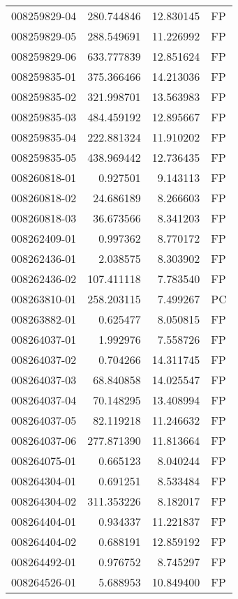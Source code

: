 \begin{tabular}{lrrl}
008259829-04 &  280.744846 &    12.830145 &   FP \\
008259829-05 &  288.549691 &    11.226992 &   FP \\
008259829-06 &  633.777839 &    12.851624 &   FP \\
008259835-01 &  375.366466 &    14.213036 &   FP \\
008259835-02 &  321.998701 &    13.563983 &   FP \\
008259835-03 &  484.459192 &    12.895667 &   FP \\
008259835-04 &  222.881324 &    11.910202 &   FP \\
008259835-05 &  438.969442 &    12.736435 &   FP \\
008260818-01 &    0.927501 &     9.143113 &   FP \\
008260818-02 &   24.686189 &     8.266603 &   FP \\
008260818-03 &   36.673566 &     8.341203 &   FP \\
008262409-01 &    0.997362 &     8.770172 &   FP \\
008262436-01 &    2.038575 &     8.303902 &   FP \\
008262436-02 &  107.411118 &     7.783540 &   FP \\
008263810-01 &  258.203115 &     7.499267 &   PC \\
008263882-01 &    0.625477 &     8.050815 &   FP \\
008264037-01 &    1.992976 &     7.558726 &   FP \\
008264037-02 &    0.704266 &    14.311745 &   FP \\
008264037-03 &   68.840858 &    14.025547 &   FP \\
008264037-04 &   70.148295 &    13.408994 &   FP \\
008264037-05 &   82.119218 &    11.246632 &   FP \\
008264037-06 &  277.871390 &    11.813664 &   FP \\
008264075-01 &    0.665123 &     8.040244 &   FP \\
008264304-01 &    0.691251 &     8.533484 &   FP \\
008264304-02 &  311.353226 &     8.182017 &   FP \\
008264404-01 &    0.934337 &    11.221837 &   FP \\
008264404-02 &    0.688191 &    12.859192 &   FP \\
008264492-01 &    0.976752 &     8.745297 &   FP \\
008264526-01 &    5.688953 &    10.849400 &   FP \\

\end{tabular}
